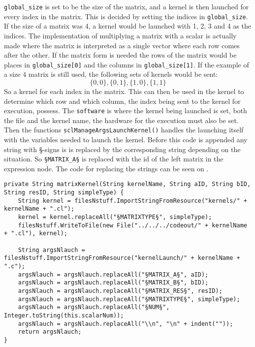 \texttt{global\_size} is set to be the size of the matrix, and a kernel is then launched for every index in the matrix.
This is decided by setting the indices in \texttt{global\_size}.
If the size of a matrix was 4, a kernel would be launched with 1, 2, 3 and 4 as the indices. 
The implementation of multiplying a matrix with a scalar is actually made where the matrix is interpreted as a single vector where each row comes after the other.
If the matrix form is needed the rows of the matrix would be places in \texttt{global\_size[0]} and the columns in \texttt{global\_size[1]}.
If the example of a size 4 matrix is still used, the following sets of kernels would be sent:
\begin{equation}
\{0,0\}, \{0,1\}, \{1,0\}, \{1,1\}
\end{equation}
So a kernel for each index in the matrix.
This can then be used in the kernel to determine which row and which column, the index being sent to the kernel for execution, possess.
The \texttt{software} is where the kernel being launched is set, both the file and the kernel name, the hardware for the execution must also be set.
Then the functions \texttt{sclManageArgsLaunchKernel()} handles the launching itself with the variables needed to launch the kernel.
Before this code is appended any string with  \S-signs is is replaced by the corresponding string depending on the situation.
So \texttt{§MATRIX\_A§} is replaced with the id of the left matrix in the expression node.
The code for replacing the strings can be seen on .

\begin{lstlisting}[caption=Code for replacing strings with the corresponding information to be appended to the outputCode.,numbers=none,frame=tlrb,label={lst:replaceString}]
private String matrixKernel(String kernelName, String aID, String bID, String resID, String simpleType) {
    String kernel = filesNstuff.ImportStringFromResource("kernels/" + kernelName + ".cl");
    kernel = kernel.replaceAll("§MATRIXTYPE§", simpleType);
    filesNstuff.WriteToFile(new File("../../../codeout/" + kernelName + ".cl"), kernel);

    String argsNlauch = filesNstuff.ImportStringFromResource("kernelLaunch/" + kernelName + ".c");
    argsNlauch = argsNlauch.replaceAll("§MATRIX_A§", aID);
    argsNlauch = argsNlauch.replaceAll("§MATRIX_B§", bID);
    argsNlauch = argsNlauch.replaceAll("§MATRIX_RES§", resID);
    argsNlauch = argsNlauch.replaceAll("§MATRIXTYPE§", simpleType);
    argsNlauch = argsNlauch.replaceAll("§NUM§", Integer.toString(this.scalarNum));
    argsNlauch = argsNlauch.replaceAll("\\n", "\n" + indent(""));
    return argsNlauch;
}
\end{lstlisting}

